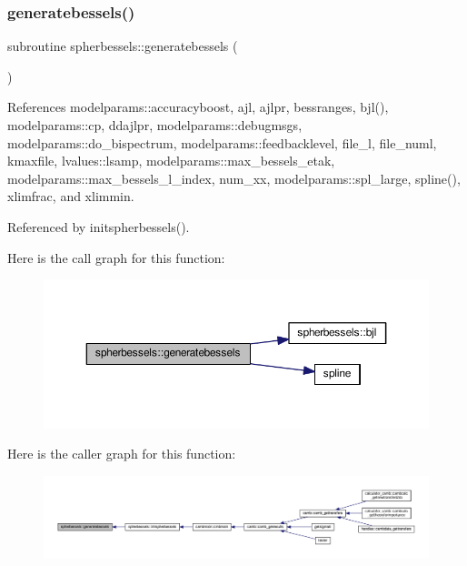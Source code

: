 \subsubsection{\texorpdfstring{generatebessels()}{generatebessels()}}
{\footnotesize\ttfamily subroutine spherbessels\+::generatebessels (\begin{DoxyParamCaption}{ }\end{DoxyParamCaption})}



References modelparams\+::accuracyboost, ajl, ajlpr, bessranges, bjl(), modelparams\+::cp, ddajlpr, modelparams\+::debugmsgs, modelparams\+::do\+\_\+bispectrum, modelparams\+::feedbacklevel, file\+\_\+l, file\+\_\+numl, kmaxfile, lvalues\+::lsamp, modelparams\+::max\+\_\+bessels\+\_\+etak, modelparams\+::max\+\_\+bessels\+\_\+l\+\_\+index, num\+\_\+xx, modelparams\+::spl\+\_\+large, spline(), xlimfrac, and xlimmin.



Referenced by initspherbessels().

Here is the call graph for this function\+:
\nopagebreak
\begin{figure}[H]
\begin{center}
\leavevmode
\includegraphics[width=350pt]{namespacespherbessels_a94dad04f4df289878f0e038437916427_cgraph}
\end{center}
\end{figure}
Here is the caller graph for this function\+:
\nopagebreak
\begin{figure}[H]
\begin{center}
\leavevmode
\includegraphics[width=350pt]{namespacespherbessels_a94dad04f4df289878f0e038437916427_icgraph}
\end{center}
\end{figure}
\mbox{\label{namespacespherbessels_ab479fd257b8fa714e8a3522ab65e11af}} 
